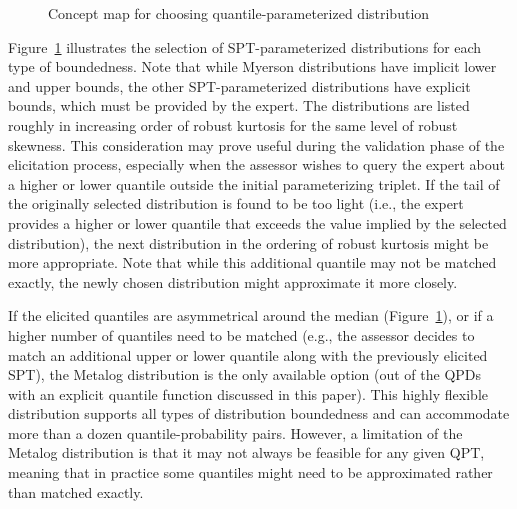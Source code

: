 \documentclass[
  fleqn,
  deca,
  blindrev
]{informs4}
\begin{document}
\begin{figure}


\caption{\label{fig-conceptmap}Concept map for choosing
quantile-parameterized distribution}

\end{figure}%

\textcolor[HTML]{ff0000}{Figure~\ref{fig-conceptmap} illustrates the
selection of SPT-parameterized distributions for each type of
boundedness. Note that while Myerson distributions have implicit lower
and upper bounds, the other SPT-parameterized distributions have
explicit bounds, which must be provided by the expert. The distributions
are listed roughly in increasing order of robust kurtosis for the same
level of robust skewness. This consideration may prove useful during the
validation phase of the elicitation process, especially when the
assessor wishes to query the expert about a higher or lower quantile
outside the initial parameterizing triplet. If the tail of the
originally selected distribution is found to be too light (i.e., the
expert provides a higher or lower quantile that exceeds the value
implied by the selected distribution), the next distribution in the
ordering of robust kurtosis might be more appropriate. Note that while
this additional quantile may not be matched exactly, the newly chosen
distribution might approximate it more closely.}

\textcolor[HTML]{ff0000}{If the elicited quantiles are asymmetrical
around the median (Figure~\ref{fig-conceptmap}), or if a higher number
of quantiles need to be matched (e.g., the assessor decides to match an
additional upper or lower quantile along with the previously elicited
SPT), the Metalog distribution is the only available option (out of the
QPDs with an explicit quantile function discussed in this paper). This
highly flexible distribution supports all types of distribution
boundedness and can accommodate more than a dozen quantile-probability
pairs. However, a limitation of the Metalog distribution is that it may
not always be feasible for any given QPT, meaning that in practice some
quantiles might need to be approximated rather than matched exactly.}
\end{document}
